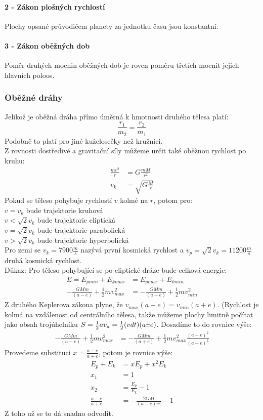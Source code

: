 \documentclass[titlepage]{report}
\newcommand{\rpm}{\sbox0{$1$}\sbox2{$\scriptstyle\pm$}
  \raise\dimexpr(\ht0-\ht2)/2\relax\box2 }
\begin{document}
\paragraph{2 - Zákon plošných rychlostí}
Plochy opsané průvodičem planety za jednotku času jsou konstantní.
\paragraph{3 - Zákon oběžných dob}
Poměr druhých mocnin oběžných dob je roven poměru třetích mocnit jejich hlavních poloos.
\subsubsection{Oběžné dráhy}
Jelikož je oběžná dráha přímo úměrná k hmotnosti druhého tělesa platí:\\
\begin{equation}
\frac{r_1}{m_2} = \frac{r_2}{m_1}
\end{equation}
Podobně to platí pro jiné kuželosečky než kružnici.\\
Z rovnosti dostředivé a gravitační síly můžeme určit také oběžnou rychlost po kruhu:\\
\begin{align}
\frac{m v^2}{r} &= G \frac{mM}{r^2}\\
v_k &= \sqrt{G \frac{M}{r}}
\end{align}
Pokud se těleso pohybuje rychlostí $v$ kolmé na $r$, potom pro:\\
$v = v_k$ bude trajektorie kruhová\\
$v < \sqrt{2}v_k$ bude trajektorie eliptická\\
$v = \sqrt{2}v_k$ bude trajektorie parabolická\\
$v > \sqrt{2}v_k$ bude trajektorie hyperbolická\\
Pro zemi se $v_k = 7900 \frac{m}{s}$ nazývá první kosmická rychlost a $v_p = \sqrt{2}v_k = 11200 \frac{m}{s}$ druhá kosmická rychlost.\\
Důkaz: Pro těleso pohybující se po eliptické dráze bude celková energie:
\begin{align}
E = E_{p min} + E_{k max} &= E_{p max} + E_{k min}\\
-\frac{GMm}{(a-e)} + \frac{1}{2}mv_{max}^2 &= -\frac{GMm}{(a+e)} + \frac{1}{2}mv_{min}^2
\end{align}
Z druhého Keplerova zákona plyne, že $v_{max}(a-e) = v_{min}(a+e)$. (Rychlost je kolmá na vzdálenost od centrálního tělesa, takže můžeme plochy limitně počítat jako obsah trojúhelníku $S = \frac{1}{2}av_a = \frac{1}{2}(vdt)(a\rpm e)$. Dosadíme to do rovnice výše:
\begin{align}
-\frac{GMm}{(a-e)} + \frac{1}{2}mv_{max}^2 &= -\frac{GMm}{(a+e)} + \frac{1}{2}mv_{max}^2\frac{(a-e)^2}{(a+e)^2}
\end{align}
Provedeme substituci $x = \frac{a-e}{a+e}$, potom je rovnice výše:
\begin{align}
E_p + E_k &= xE_p + x^2E_k\\
x_1 &= 1\\
x_2 &= \frac{E_p}{E_k} - 1\\
\frac{a-e}{a+e} &= -\frac{2GM}{(a-e)v^2} - 1
\end{align}
Z toho už se to dá snadno odvodit.
\end{document}
